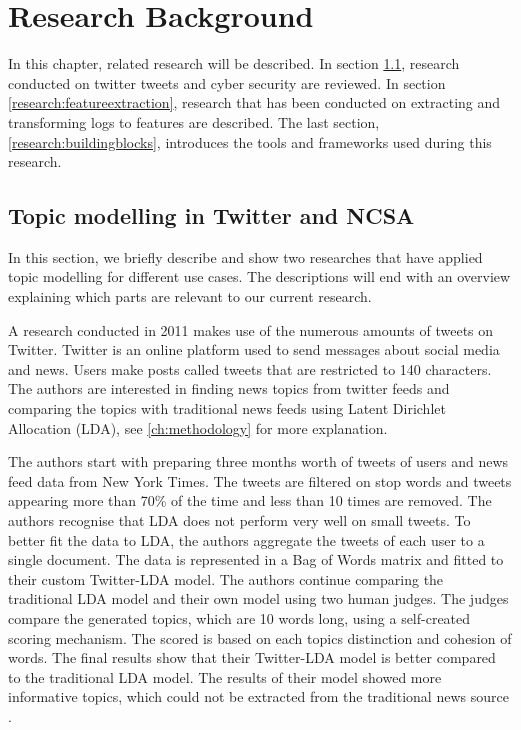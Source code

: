 \chapter{Research Background}  \label{ch:research}

In this chapter, related research will be described. In section \ref{research:relatedwork}, research conducted on twitter tweets and cyber security are reviewed. In section \ref{research:featureextraction}, research that has been conducted on extracting and transforming logs to features are described. The last section, \ref{research:buildingblocks}, introduces the tools and frameworks used during this research.

\section{Topic modelling in Twitter and NCSA} \label{research:relatedwork}
In this section, we briefly describe and show two researches that have applied topic modelling for different use cases. The descriptions will end with an overview explaining which parts are relevant to our current research. 

\setlength{\parindent}{3ex} A research conducted in 2011 makes use of the numerous amounts of tweets on Twitter. Twitter is an online platform used to send messages about social media and news. Users make posts called tweets that are restricted to 140 characters. The authors are interested in finding news topics from twitter feeds and comparing the topics with traditional news feeds using Latent Dirichlet Allocation (LDA), see \ref{ch:methodology} for more explanation.


The authors start with preparing three months worth of tweets of users and news feed data from New York Times. The tweets are filtered on stop words and tweets appearing more than 70\% of the time and less than 10 times are removed. The authors recognise that LDA does not perform very well on small tweets. To better fit the data to LDA, the authors aggregate the tweets of each user to a single document. The data is represented in a Bag of Words matrix and fitted to their custom Twitter-LDA model. The authors continue comparing the traditional LDA model and their own model using two human judges. The judges compare the generated topics, which are 10 words long, using a self-created scoring mechanism. The scored is based on each topics distinction and cohesion of words. The final results show that their Twitter-LDA model is better compared to the traditional LDA model. The results of their model showed more informative topics, which could not be extracted from the traditional news source \cite{Zhao2011ComparingModels}. 

